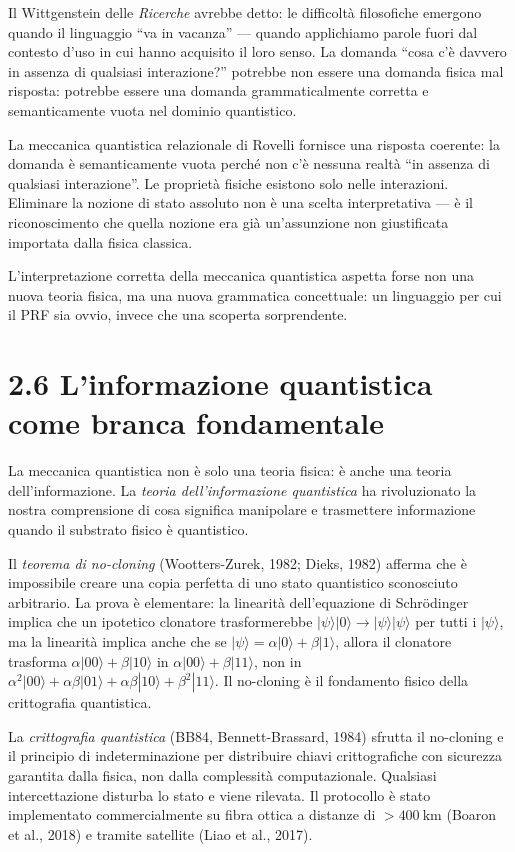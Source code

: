 \documentclass[11.5pt,a4paper,openany]{book}
\theoremstyle{remark}
\begin{document}
Il Wittgenstein delle \textit{Ricerche} avrebbe detto: le difficoltà filosofiche emergono quando il linguaggio ``va in vacanza'' --- quando applichiamo parole fuori dal contesto d'uso in cui hanno acquisito il loro senso. La domanda ``cosa c'è davvero in assenza di qualsiasi interazione?'' potrebbe non essere una domanda fisica mal risposta: potrebbe essere una domanda grammaticalmente corretta e semanticamente vuota nel dominio quantistico.

La meccanica quantistica relazionale di Rovelli fornisce una risposta coerente: la domanda è semanticamente vuota perché non c'è nessuna realtà ``in assenza di qualsiasi interazione''. Le proprietà fisiche esistono solo nelle interazioni. Eliminare la nozione di stato assoluto non è una scelta interpretativa --- è il riconoscimento che quella nozione era già un'assunzione non giustificata importata dalla fisica classica.

L'interpretazione corretta della meccanica quantistica aspetta forse non una nuova teoria fisica, ma una nuova grammatica concettuale: un linguaggio per cui il PRF sia ovvio, invece che una scoperta sorprendente.

\section{2.6 L'informazione quantistica come branca fondamentale}

La meccanica quantistica non è solo una teoria fisica: è anche una teoria dell'informazione. La \textit{teoria dell'informazione quantistica} ha rivoluzionato la nostra comprensione di cosa significa manipolare e trasmettere informazione quando il substrato fisico è quantistico.

Il \textit{teorema di no-cloning} (Wootters-Zurek, 1982; Dieks, 1982) afferma che è impossibile creare una copia perfetta di uno stato quantistico sconosciuto arbitrario. La prova è elementare: la linearità dell'equazione di Schrödinger implica che un ipotetico clonatore trasformerebbe $|\psi\rangle|0\rangle \to |\psi\rangle|\psi\rangle$ per tutti i $|\psi\rangle$, ma la linearità implica anche che se $|\psi\rangle = \alpha|0\rangle + \beta|1\rangle$, allora il clonatore trasforma $\alpha|00\rangle + \beta|10\rangle$ in $\alpha|00\rangle + \beta|11\rangle$, non in $\alpha^2|00\rangle + \alpha\beta|01\rangle + \alpha\beta|10\rangle + \beta^2|11\rangle$. Il no-cloning è il fondamento fisico della crittografia quantistica.

La \textit{crittografia quantistica} (BB84, Bennett-Brassard, 1984) sfrutta il no-cloning e il principio di indeterminazione per distribuire chiavi crittografiche con sicurezza garantita dalla fisica, non dalla complessità computazionale. Qualsiasi intercettazione disturba lo stato e viene rilevata. Il protocollo è stato implementato commercialmente su fibra ottica a distanze di $>400\ \text{km}$ (Boaron et al., 2018) e tramite satellite (Liao et al., 2017).
\end{document}
